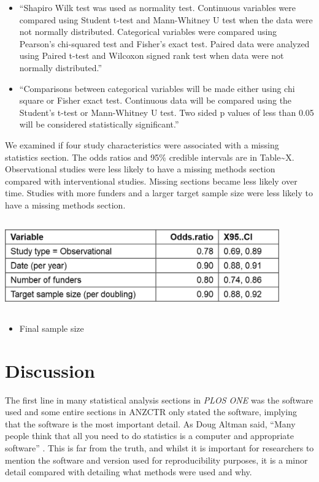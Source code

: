\documentclass[12pt]{article}
\providecommand{\tightlist}{%
  \setlength{\itemsep}{0pt}\setlength{\parskip}{0pt}}
\begin{document}
\begin{itemize}
\tightlist
\item
  ``Shapiro Wilk test was used as normality test. Continuous variables
  were compared using Student t-test and Mann-Whitney U test when the
  data were not normally distributed. Categorical variables were
  compared using Pearson's chi-squared test and Fisher's exact test.
  Paired data were analyzed using Paired t-test and Wilcoxon signed rank
  test when data were not normally distributed.''
\item
  ``Comparisons between categorical variables will be made either using
  chi square or Fisher exact test. Continuous data will be compared
  using the Student's t-test or Mann-Whitney U test. Two sided p values
  of less than 0.05 will be considered statistically significant.''
\end{itemize}

We examined if four study characteristics were associated with a missing
statistics section. The odds ratios and 95\% credible intervals are in
Table\textasciitilde X. Observational studies were less likely to have a
missing methods section compared with interventional studies. Missing
sections became less likely over time. Studies with more funders and a
larger target sample size were less likely to have a missing methods
section.

\includegraphics[width=4.66in,height=1.55in,keepaspectratio]{asa_template_files/figure-latex/unnamed-chunk-10-1.png}

\begin{itemize}
\tightlist
\item
  Final sample size
\end{itemize}

\hypertarget{discussion}{%
\section{Discussion}\label{discussion}}

The first line in many statistical analysis sections in \emph{PLOS ONE}
was the software used and some entire sections in ANZCTR only stated the
software, implying that the software is the most important detail. As
Doug Altman said, ``Many people think that all you need to do statistics
is a computer and appropriate software'' \citep{Altman1994}. This is far
from the truth, and whilst it is important for researchers to mention
the software and version used for reproducibility purposes, it is a
minor detail compared with detailing what methods were used and why.
\end{document}
